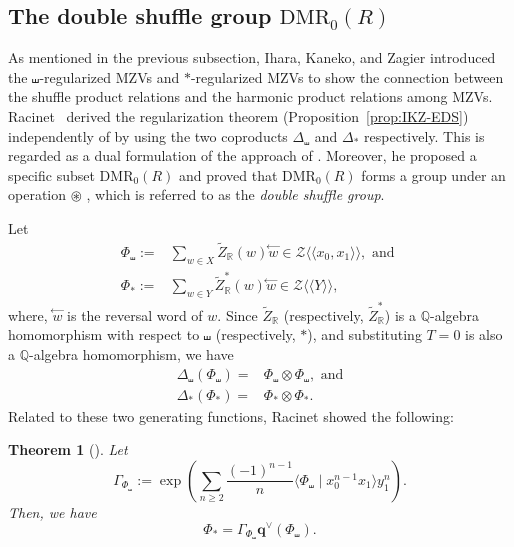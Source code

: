\documentclass[15pt,oneside,reqno]{amsart}
\newtheorem{thm}[df]{Theorem}
\theoremstyle{remark}{
\newtheorem{lem}[df]{Lemma}
\newtheorem{prop}[df]{Proposition}
\newtheorem{ex}[df]{Example}
\newtheorem{rmk}[df]{Remark}
}
\newcommand{\Q}{\mathbb{Q}}
\newcommand{\DMR}{\mathrm{DMR}}
\newcommand{\ls}{\mathfrak{ls}}
\begin{document}
\subsection{The double shuffle group $\DMR_0(R)$}\label{subsect:DMR}

As mentioned in the previous subsection, Ihara, Kaneko, and Zagier \cite{Ihara-Kaneko-Zagier} introduced the $\shuffle$-regularized MZVs and $*$-regularized MZVs to show the connection between the shuffle product relations and the harmonic product relations among MZVs.
Racinet~\cite{Racinet} derived the regularization theorem (Proposition~\ref{prop:IKZ-EDS}) independently of
\cite{Ihara-Kaneko-Zagier} by using the two coproducts $\Delta_{\shuffle}$ and $\Delta_*$ respectively.
This is regarded as a dual formulation of the approach of \cite{Ihara-Kaneko-Zagier}.
Moreover, he proposed a specific subset $\DMR_0(R)$ and proved that $\DMR_0(R)$ forms a group under an operation
$\circledast$ \cite[Th\'eor\`eme~1]{Racinet}, which is referred to as the \textit{double shuffle group}.











Let
\begin{align*}
\Phi_{\shuffle} :=& \sum_{w\in X} \widetilde{Z}_{\mathbb{R}}(w) \overset{\leftarrow}{w} \in \mathcal{Z} \langle \langle x_0,x_1 \rangle\rangle, \text{ and }\\
\Phi_{*} :=& \sum_{w\in Y} \widetilde{Z}_{\mathbb{R}}^{*}(w) \overset{\leftarrow}{w} \in \mathcal{Z} \langle \langle Y \rangle\rangle,
\end{align*}
where, $\overset{\leftarrow}{w}$ is the reversal word of $w$.
Since $\widetilde{Z}_{\mathbb{R}}$ (respectively, $\widetilde{Z}_{\mathbb{R}}^*$) is a $\Q$-algebra homomorphism with respect to $\shuffle$ (respectively, $*$), and substituting $T = 0$ is also a $\Q$-algebra homomorphism, we have
\begin{align*}
\Delta_{\shuffle}(\Phi_{\shuffle}) =& \Phi_{\shuffle} \otimes \Phi_{\shuffle},\text{ and}\\
 \Delta_*(\Phi_*) =& \Phi_* \otimes \Phi_*.
\end{align*}
Related to these two generating functions, Racinet showed the following:
\begin{thm}[{\cite[Corollary 2.24]{Racinet}}]\label{thm:regularized-Racinet}
Let
\[
\Gamma_{\Phi_\shuffle} :=\exp \left( \sum_{n\ge 2} \frac{(-1)^{n-1}}{n} \langle \Phi_{\shuffle} \mid x_0^{n-1}x_1 \rangle y_1^n \right).
\]
Then, we have
\[
\Phi_* = \Gamma_{\Phi_\shuffle} \mathbf{q}^{\vee}(\Phi_{\shuffle}).
\]
\end{thm}
\end{document}
